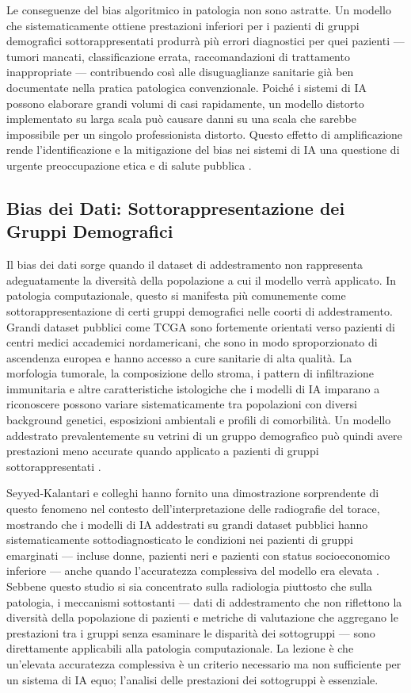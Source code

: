 Le conseguenze del bias algoritmico in patologia non sono astratte. Un modello che sistematicamente ottiene prestazioni inferiori per i pazienti di gruppi demografici sottorappresentati produrrà più errori diagnostici per quei pazienti — tumori mancati, classificazione errata, raccomandazioni di trattamento inappropriate — contribuendo così alle disuguaglianze sanitarie già ben documentate nella pratica patologica convenzionale. Poiché i sistemi di IA possono elaborare grandi volumi di casi rapidamente, un modello distorto implementato su larga scala può causare danni su una scala che sarebbe impossibile per un singolo professionista distorto. Questo effetto di amplificazione rende l'identificazione e la mitigazione del bias nei sistemi di IA una questione di urgente preoccupazione etica e di salute pubblica \cite{seyyedkalantari2021}.

\subsection{Bias dei Dati: Sottorappresentazione dei Gruppi Demografici}

Il bias dei dati sorge quando il dataset di addestramento non rappresenta adeguatamente la diversità della popolazione a cui il modello verrà applicato. In patologia computazionale, questo si manifesta più comunemente come sottorappresentazione di certi gruppi demografici nelle coorti di addestramento. Grandi dataset pubblici come TCGA sono fortemente orientati verso pazienti di centri medici accademici nordamericani, che sono in modo sproporzionato di ascendenza europea e hanno accesso a cure sanitarie di alta qualità. La morfologia tumorale, la composizione dello stroma, i pattern di infiltrazione immunitaria e altre caratteristiche istologiche che i modelli di IA imparano a riconoscere possono variare sistematicamente tra popolazioni con diversi background genetici, esposizioni ambientali e profili di comorbilità. Un modello addestrato prevalentemente su vetrini di un gruppo demografico può quindi avere prestazioni meno accurate quando applicato a pazienti di gruppi sottorappresentati \cite{chen2023}.

Seyyed-Kalantari e colleghi hanno fornito una dimostrazione sorprendente di questo fenomeno nel contesto dell'interpretazione delle radiografie del torace, mostrando che i modelli di IA addestrati su grandi dataset pubblici hanno sistematicamente sottodiagnosticato le condizioni nei pazienti di gruppi emarginati — incluse donne, pazienti neri e pazienti con status socioeconomico inferiore — anche quando l'accuratezza complessiva del modello era elevata \cite{seyyedkalantari2021}. Sebbene questo studio si sia concentrato sulla radiologia piuttosto che sulla patologia, i meccanismi sottostanti — dati di addestramento che non riflettono la diversità della popolazione di pazienti e metriche di valutazione che aggregano le prestazioni tra i gruppi senza esaminare le disparità dei sottogruppi — sono direttamente applicabili alla patologia computazionale. La lezione è che un'elevata accuratezza complessiva è un criterio necessario ma non sufficiente per un sistema di IA equo; l'analisi delle prestazioni dei sottogruppi è essenziale.

